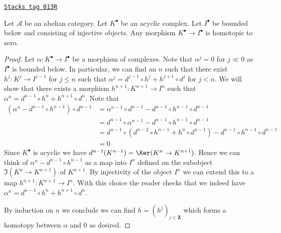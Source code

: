 \begin{lemma}
\label{derived-lemma-acyclic-is-zero}
\href{https://stacks.math.columbia.edu/tag/013R}{\texttt{Stacks tag 013R}}

Let $\mathcal{A}$ be an abelian category.
Let $K^\bullet$ be an acyclic complex.
Let $I^\bullet$ be bounded below and consisting of injective objects.
Any morphism $K^\bullet \to I^\bullet$ is homotopic to zero.
\end{lemma}

\begin{proof}
Let $\alpha : K^\bullet \to I^\bullet$ be a morphism of
complexes. Note that $\alpha^j = 0$ for $j \ll 0$ as $I^\bullet$
is bounded below. In particular, we can find an $n$ such that
there exist $h^j :  K^j \to I^{j - 1}$ for $j \leq n$ such that
$\alpha^j = d^{j - 1} \circ h^j + h^{j + 1} \circ d^j$
for $j < n$. We will show that there exists a morphism
$h^{n + 1} : K^{n + 1} \to I^n$
such that $\alpha^n = d^{n - 1} \circ h^n + h^{n + 1} \circ d^n$.
Note that
\begin{align*}
(\alpha^n - d^{n - 1} \circ h^{n - 1}) \circ d^{n - 1}
& =
\alpha^{n - 1} \circ d^{n - 1} - d^{n - 1} \circ h^{n - 1} \circ d^{n - 1} \\
& =
d^{n - 1} \circ \alpha^{n - 1} - d^{n - 1} \circ h^{n - 1} \circ d^{n - 1} \\
& =
d^{n - 1} \circ (d^{n - 2} \circ h^{n - 1} + h^n \circ d^{n - 1})
- d^{n - 1} \circ h^{n - 1} \circ d^{n - 1} \\
& = 0
\end{align*}
Since $K^\bullet$ is acyclic we have
$d^{n - 1}(K^{n - 1}) = \Ker(K^n \to K^{n + 1})$.
Hence we can think of $\alpha^n -  d^{n - 1} \circ h^{n - 1}$
as a map into $I^n$ defined on the subobject $\Im(K^n \to K^{n + 1})$
of $K^{n + 1}$. By injectivity of the object $I^n$ we can extend this to
a map $h^{n + 1} : K^{n + 1} \to I^n$. With this choice the reader
checks that we indeed have
$\alpha^n = d^{n - 1} \circ h^n + h^{n + 1} \circ d^n$.

\medskip\noindent
By induction on $n$ we conclude we can find $h  = (h^j)_{j \in \mathbf{Z}}$
which forms a homotopy between $\alpha$ and $0$ as desired.
\end{proof}


